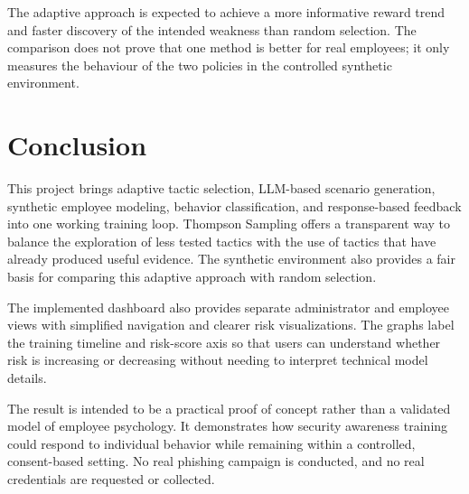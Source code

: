 \documentclass[12pt,a4paper]{article}
\begin{document}
The adaptive approach is expected to achieve a more informative reward
trend and faster discovery of the intended weakness than random
selection. The comparison does not prove that one method is better for
real employees; it only measures the behaviour of the two policies in
the controlled synthetic environment.



\section{Conclusion}

This project brings adaptive tactic selection, LLM-based scenario
generation, synthetic employee modeling, behavior classification, and
response-based feedback into one working training loop. Thompson
Sampling offers a transparent way to balance the exploration of less
tested tactics with the use of tactics that have already produced
useful evidence. The synthetic environment also provides a fair basis
for comparing this adaptive approach with random selection.

The implemented dashboard also provides separate administrator and
employee views with simplified navigation and clearer risk visualizations.
The graphs label the training timeline and risk-score axis so that users
can understand whether risk is increasing or decreasing without needing
to interpret technical model details.

The result is intended to be a practical proof of concept rather than
a validated model of employee psychology. It demonstrates how security
awareness training could respond to individual behavior while remaining
within a controlled, consent-based setting. No real phishing campaign
is conducted, and no real credentials are requested or collected.

\clearpage
\nocite{*}
\begingroup
\justifying
\setlength{\bibhang}{0.5in}
\setlength{\bibitemsep}{0.75\baselineskip}
\setlength{\emergencystretch}{2em}
\printbibliography[heading=bibintoc,title={References}]
\endgroup
\end{document}
